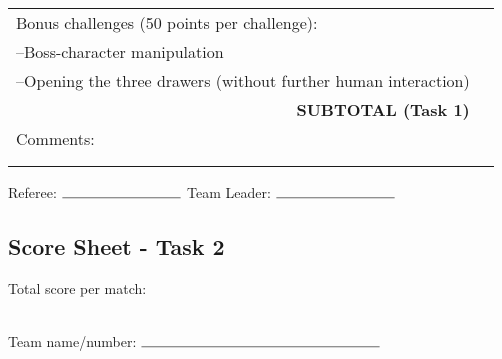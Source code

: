 \documentclass{article}
\begin{document}
\begin{center}
\begin{tabular}{|m{0.4cm}|m{0.8cm}|m{1cm}|m{1cm}|m{1.2cm}|m{0.8cm}|m{0.8cm}|m{1cm}|m{0.8cm}|m{0.8cm}|}
    \multicolumn{9}{|l|}{Bonus challenges (50 points per challenge):} &\\
    \multicolumn{9}{|l|}{--Boss-character manipulation} &\\
    \multicolumn{9}{|l|}{--Opening the three drawers (without further human interaction)} &\\
    \hline
    \multicolumn{9}{|r|}{\textbf{SUBTOTAL (Task 1)}  } &\\ 
    \hline
    \multicolumn{10}{|l|}{Comments:} \\ 
    \multicolumn{10}{|l|}{} \\
    \multicolumn{10}{|l|}{} \\
    \hline
\end{tabular}
\end{center}

\begin{center} Referee: $\rule{3cm}{0.15mm}$ Team Leader: $\rule{3cm}{0.15mm}$ \end{center}

\newpage

\subsection{Score Sheet - Task 2}

Total score per match:\\ \\

\begin{center} Team name/number: $\rule{6cm}{0.15mm}$ \end{center}
\end{document}
